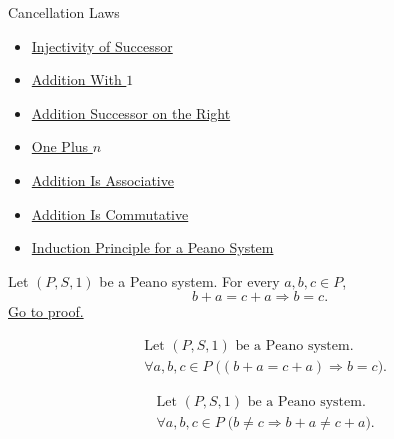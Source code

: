 \begin{topicbox}{Cancellation Laws}
\begin{dependencies}
\begin{itemize}
  \item \hyperref[ax:peano-successor-injective]{Injectivity of Successor}
  \item \hyperref[thm:addition-with-one]{Addition With $1$}
  \item \hyperref[thm:addition-successor-on-right]{Addition Successor on the Right}
  \item \hyperref[thm:one-plus-n]{One Plus $n$}
  \item \hyperref[thm:addition-associative]{Addition Is Associative}
  \item \hyperref[thm:addition-commutative]{Addition Is Commutative}
  \item \hyperref[thm:induction-principle-for-peano-system]{Induction Principle for a Peano System}
\end{itemize}
\end{dependencies}

\begin{tcolorbox}[colback=thmbox, colframe=thmborder, arc=2pt,
  left=6pt, right=6pt, top=4pt, bottom=4pt,
  title={\small\textbf{Theorem (Right Cancellation for Addition)}},
  fonttitle=\small\bfseries]
\begin{theorem}
\label{thm:addition-right-cancellation}
Let $(P,S,1)$ be a Peano system. For every $a,b,c \in P$,
\[
b+a=c+a
\Longrightarrow
b=c.
\]
\hyperref[prf:addition-right-cancellation]{Go to proof.}
\end{theorem}
\end{tcolorbox}

\begin{remark*}
\[
\begin{aligned}
&\text{Let } (P,S,1) \text{ be a Peano system.}\\
&\forall a,b,c \in P\;\bigl((b+a=c+a) \Longrightarrow b=c\bigr).
\end{aligned}
\]
\end{remark*}

\begin{remark*}
\[
\begin{aligned}
&\text{Let } (P,S,1) \text{ be a Peano system.}\\
&\forall a,b,c \in P\;\bigl(b \neq c \Longrightarrow b+a \neq c+a\bigr).
\end{aligned}
\]
\end{remark*}


\end{topicbox}
